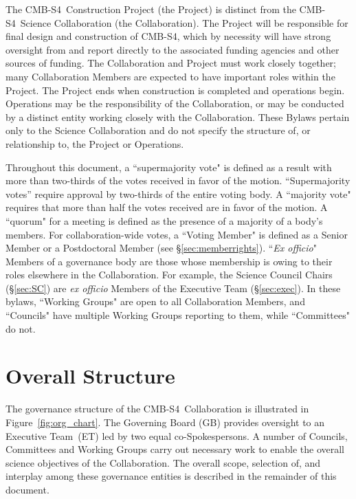\documentclass[12pt]{article}
\newcommand{\exec}{{Executive Team}}
\newcommand\collabname{CMB-S4}
\begin{document}
The \collabname\ Construction Project (the Project) is distinct from the \collabname\ Science Collaboration (the Collaboration). The Project will be responsible for final design and construction of \collabname, which by necessity will have strong oversight from and  report directly to the associated funding agencies and other sources of funding.  The Collaboration and Project must work closely together; many Collaboration Members are expected to have important roles within the Project. The Project ends when construction is completed and operations begin. Operations may be the responsibility of the Collaboration, or may be conducted by a distinct entity working closely with the Collaboration. These Bylaws pertain only to the Science Collaboration and do not specify the structure of, or relationship to, the Project or Operations. 
\vskip 12pt


Throughout this document,  a ``supermajority vote" is defined as a result with more than two-thirds of the votes received in favor of  the motion. ``Supermajority votes'' require approval by two-thirds of the entire voting body. A ``majority vote" requires that more than half the votes received are in favor of the motion.   A ``quorum" for a meeting is defined as the presence of a majority of a body's members.   For collaboration-wide votes, a ``Voting Member" is  defined as a Senior Member or a Postdoctoral Member (see \S\ref{sec:memberrights}). ``{\it Ex officio}" Members of a governance body are those whose membership is owing to their roles elsewhere in the Collaboration.  For example, the Science Council Chairs (\S\ref{sec:SC}) are {\it ex officio} Members of the Executive Team (\S\ref{sec:exec}).  In these bylaws,  ``Working Groups" are open to all Collaboration Members, and ``Councils" have multiple Working Groups reporting to them, while ``Committees" do not.  





\section{Overall Structure}
The governance structure of the \collabname\ Collaboration  is illustrated in Figure~\ref{fig:org_chart}.  The Governing Board (GB) provides oversight to an \exec\ (ET) led by two equal co-Spokespersons.  A number of Councils, Committees and Working Groups carry out necessary work to enable the overall science objectives of the Collaboration. The overall scope, selection of, and interplay among these governance entities is described in the remainder of this document. 
\end{document}
